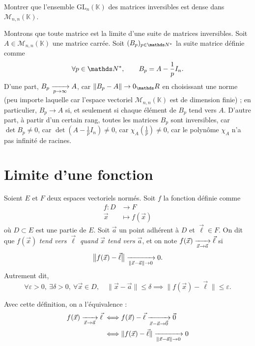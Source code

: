 \begin{exo}
	\begin{slshape}
		Montrer que l'ensemble $\mathrm{GL}_n(\mathds{K})$\/ des matrices inversibles est dense dans $\mathcal{M}_{n,n}(\mathds{K})$.
	\end{slshape}

	\noindent
	Montrons que toute matrice est la limite d'une suite de matrices inversibles.
	Soit $A \in \mathcal{M}_{n,n}(\mathds{K})$\/ une matrice carrée.
	Soit $(B_p)_{p \in \N^*}$\/ la suite matrice définie comme \[
		\forall p \in \N^*, \quad\quad B_p = A - \frac{1}{p} I_n
	.\]
	D'une part, $B_p \xrightarrow[p\to \infty]{} A$, car $\|B_p - A\| \to 0_\R$\/ en choisissant une norme (peu importe laquelle car l'espace vectoriel $\mathcal{M}_{n,n}(\mathds{K})$\/ est de dimension finie) ; en particulier, $B_p \to A$\/ si, et seulement si chaque élément de $B_p$\/ tend vers $A$.
	D'autre part, à partir d'un certain rang, toutes les matrices $B_p$\/ sont inversibles, car $\det B_p \neq 0$, car $\det\left(A - \frac{1}{p} I_n\right) \neq 0$, car $\chi_A\left(\frac{1}{p}\right) \neq 0$, car le polynôme $\chi_A$\/ n'a pas infinité de racines.
\end{exo}

\section{Limite d'une fonction}

\begin{defn}
	Soient $E$\/ et $F$\/ deux espaces vectoriels normés. Soit $f$\/ la fonction définie comme \begin{align*}
		f: D &\longrightarrow F \\
		\vec{x} &\longmapsto f(\vec{x})
	\end{align*}
	où $D \subset E$\/ est une partie de $E$. Soit $\vec{a}$\/ un point adhérent à $D$\/ et $\vec{\ell} \in F$.
	On dit que $f(\vec{x})$\/ \textit{tend vers $\vec{\ell}$\/ quand $\vec{x}$\/ tend vers $\vec{a}$}, et on note $f(\vec{x}) \xrightarrow[\vec{x} \to \vec{a}]{} \vec{\ell}$\/ si \[
		\big\|f(\vec{x}) - \vec{\ell}\big\| \xrightarrow[\|\vec{x} - \vec{a}\| \to 0]{}0
	.\]
	Autrement dit, \[
		\forall \varepsilon > 0,\: \exists \delta > 0,\: \forall \vec{x} \in D, \quad \|\vec{x} - \vec{a}\| \le \delta \implies \|f(\vec{x}) - \vec{\ell}\| \le \varepsilon
	.\]
\end{defn}

Avec cette définition, on a l'équivalence :
\begin{align*}
	f(\vec{x}) \xrightarrow[\vec{x}\to \vec{a}]{} \vec{\ell} \iff& f(\vec{x}) - \vec{\ell} \xrightarrow[\vec{x} - \vec{a}\to \vec{0}]{} \vec{0} \\
	\iff& \|f(\vec{x}) - \vec{\ell}\| \xrightarrow[\|\vec{x} - \vec{a}\| \to 0]{} 0 \\
\end{align*}


